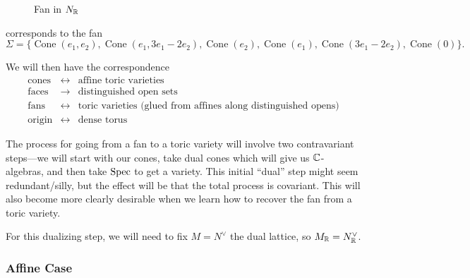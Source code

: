 \documentclass[12pt]{article}
\DeclareMathOperator{\Cone}{Cone}
\begin{document}
\begin{figure}[H]
    \centering
    \caption{Fan in $N_{\mathbb{R}}$}
\end{figure}

corresponds to the fan
\[\Sigma=\{\Cone(e_1,e_2),\Cone(e_1,3e_1-2e_2),\Cone(e_2),\Cone(e_1),\Cone(3e_1-2e_2),\Cone(0)\}.\]

We will then have the correspondence
\[\begin{array}{rcl}
    \text{cones} & \longleftrightarrow & \text{affine toric varieties}\\
    \text{faces} & \longrightarrow & \text{distinguished open sets}\\
    \text{fans} & \longleftrightarrow & \text{toric varieties (glued from affines along distinguished opens)}\\
    \text{origin} & \longleftrightarrow & \text{dense torus}
\end{array}\]

The process for going from a fan to a toric variety will involve two contravariant steps---we will start with our cones, take dual cones which will give us $\mathbb{C}$-algebras, and then take $\operatorname{Spec}$ to get a variety. This initial ``dual'' step might seem redundant/silly, but the effect will be that the total process is covariant. This will also become more clearly desirable when we learn how to recover the fan from a toric variety.

For this dualizing step, we will need to fix $M = N^\vee$ the dual lattice, so $M_{\mathbb{R}} = N_{\mathbb{R}}^\vee$.

\subsubsection{Affine Case}
\end{document}
